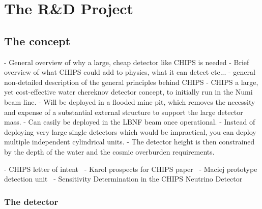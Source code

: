 \chapter{The \chips R\&D Project} %
\label{chap:chips}

\section{The \chips concept} %
\label{sec:chips_concept} %

- General overview of why a large, cheap detector like CHIPS is needed
- Brief overview of what CHIPS could add to physics, what it can detect etc...
- general non-detailed description of the general principles behind CHIPS
- CHIPS a large, yet cost-effective water chereknov detector concept, to initially run in the
Numi beam line.
- Will be deployed in a flooded mine pit, which removes the necessity and expense of a substantial
external structure to support the large detector mass.
- Can easily be deployed in the LBNF beam once operational.
- Instead of deploying very large single detectors which would be impractical, you can deploy
multiple independent cylindrical units.
- The detector height is then constrained by the depth of the water and the cosmic overburden
requirements.

- CHIPS letter of intent~\cite{adamson2013}
- Karol prospects for CHIPS paper~\cite{lang2015}
- Maciej prototype detection unit~\cite{pfutznerProto2017}
- Sensitivity Determination in the CHIPS Neutrino Detector~\cite{adde2016}

\subsection{The \chipsm detector} %
\label{sec:chips_concept_m} %

